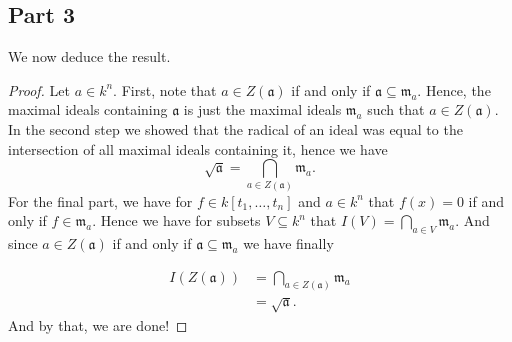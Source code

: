 \subsection{Part 3}
We now deduce the result. 
\begin{proof}
Let $a \in k^n$. 
First, 
note that $a \in Z(\mathfrak{a})$ if and only if $\mathfrak{a}\subseteq \mathfrak{m}_{a}$. 
Hence, 
the maximal ideals containing $\mathfrak{a}$ is just the maximal ideals $\mathfrak{m}_{a}$ such that $a \in Z(\mathfrak{a})$. 
In the second step we showed that the radical of an ideal was equal to the intersection of all maximal ideals containing it, 
hence we have 
\begin{equation*}
    \sqrt{\mathfrak{a}} = \bigcap_{a \in Z(\mathfrak{a})}\mathfrak{m}_{a}. 
\end{equation*}
For the final part, 
we have for $f\in k[t_1,\ldots,t_n]$ and $a\in k^n$ that $f(x) = 0$ if and only if $f \in \mathfrak{m}_{a}$. 
Hence we have for subsets $V\subseteq k^n$ that $I(V) = \bigcap_{a \in V}\mathfrak{m}_{a}$. 
And since $a \in Z(\mathfrak{a})$ if and only if $\mathfrak{a}\subseteq \mathfrak{m}_{a}$ we have finally

\begin{align*}
    I(Z(\mathfrak{a})) 
    &= \bigcap_{a \in Z(\mathfrak{a})}\mathfrak{m}_{a} \\
    &= \sqrt{\mathfrak{a}}.
\end{align*}
And by that, we are done!
\end{proof}




